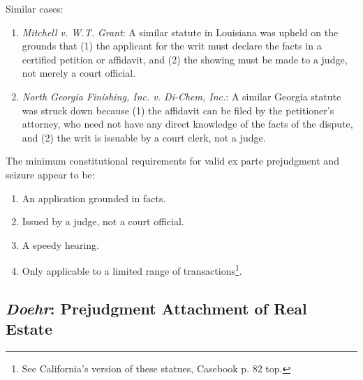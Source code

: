 Similar cases:

\begin{enumerate}
    \item \emph{Mitchell v. W.T. Grant}: A similar statute in Louisiana was upheld on the grounds that (1) the applicant for the writ must declare the facts in a certified petition or affidavit, and (2) the showing must be made to a judge, not merely a court official.
    \item \emph{North Georgia Finishing, Inc. v. Di-Chem, Inc.}: A similar Georgia statute was struck down because (1) the affidavit can be filed by the petitioner's attorney, who need not have any direct knowledge of the facts of the dispute, and (2) the writ is issuable by a court clerk, not a judge.
\end{enumerate}

The minimum constitutional requirements for valid ex parte prejudgment and seizure appear to be:

\begin{enumerate}
    \item An application grounded in facts.
    \item Issued by a judge, not a court official.
    \item A speedy hearing.
    \item Only applicable to a limited range of transactions\footnote{See California's version of these statues, Casebook p. 82 top.}.
\end{enumerate}

\subsection{\emph{Doehr}: Prejudgment Attachment of Real Estate}

